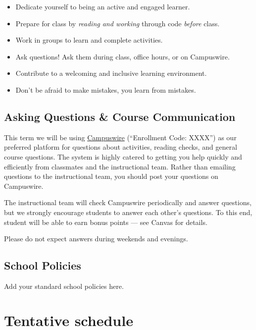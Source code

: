 \documentclass[
  letterpaper,
  DIV=11,
  numbers=noendperiod]{scrreprt}
\providecommand{\tightlist}{%
  \setlength{\itemsep}{0pt}\setlength{\parskip}{0pt}}\usepackage{longtable,booktabs,array}
\begin{document}
\begin{itemize}
\tightlist
\item
  Dedicate yourself to being an active and engaged learner.
\item
  Prepare for class by \emph{reading and working} through code
  \emph{before} class.
\item
  Work in groups to learn and complete activities.
\item
  Ask questions! Ask them during class, office hours, or on Campuswire.
\item
  Contribute to a welcoming and inclusive learning environment.
\item
  Don't be afraid to make mistakes, you learn from mistakes.
\end{itemize}

\hypertarget{asking-questions-course-communication}{%
\section*{Asking Questions \& Course
Communication}\label{asking-questions-course-communication}}

This term we will be using \href{https://campuswire.com}{Campuswire}
(``Enrollment Code: XXXX'') as our preferred platform for questions
about activities, reading checks, and general course questions. The
system is highly catered to getting you help quickly and efficiently
from classmates and the instructional team. Rather than emailing
questions to the instructional team, you should post your questions on
Campuswire.

The instructional team will check Campuswire periodically and answer
questions, but we strongly encourage students to answer each other's
questions. To this end, student will be able to earn bonus points ---
see Canvas for details.

Please do not expect answers during weekends and evenings.

\hypertarget{school-policies}{%
\section*{School Policies}\label{school-policies}}

Add your standard school policies here.


\hypertarget{tentative-schedule}{%
\chapter*{Tentative schedule}\label{tentative-schedule}}
\end{document}
